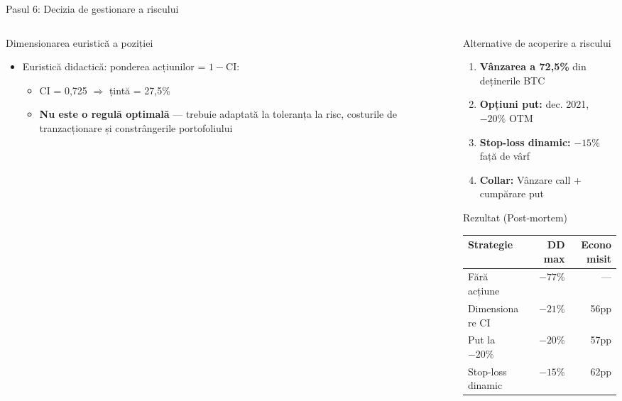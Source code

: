 \documentclass[9pt, aspectratio=169, t]{beamer}
\begin{document}
\begin{frame}{Pasul 6: Decizia de gestionare a riscului}
\begin{cminipage}{0.95\textwidth}
{\begin{columns}[T]
\begin{column}{0.47\textwidth}
            \begin{block}{Dimensionarea euristică a poziției}
                \begin{itemize}\setlength{\itemsep}{0pt}
                    \item Euristică didactică: ponderea acțiunilor = $1 - \text{CI}$:
                    \begin{itemize}\setlength{\itemsep}{0pt}
                        \item CI = 0,725 $\Rightarrow$ țintă = 27,5\%
                        \item \textbf{Nu este o regulă optimală} --- trebuie adaptată la toleranța la risc, costurile de tranzacționare și constrângerile portofoliului
                    \end{itemize}
                \end{itemize}
            \end{block}
        \end{column}
        \begin{column}{0.47\textwidth}
            \begin{exampleblock}{Alternative de acoperire a riscului}
                \begin{enumerate}\setlength{\itemsep}{0pt}
                    \item \textbf{Vânzarea a 72,5\%} din deținerile BTC
                    \item \textbf{Opțiuni put:} dec. 2021, $-20\%$ OTM
                    \item \textbf{Stop-loss dinamic:} $-15\%$ față de vârf
                    \item \textbf{Collar:} Vânzare call + cumpărare put
                \end{enumerate}
            \end{exampleblock}
            \vspace{-1mm}
            \begin{block}{Rezultat (Post-mortem)}
                \begin{tabular}{lrr}
                    \toprule
                    \textbf{Strategie} & \textbf{DD max} & \textbf{Economisit} \\
                    \midrule
                    Fără acțiune & $-77\%$ & --- \\
                    Dimensionare CI & $-21\%$ & 56pp \\
                    Put la $-20\%$ & $-20\%$ & 57pp \\
                    Stop-loss dinamic & $-15\%$ & 62pp \\

\end{tabular}
\end{block}
\end{column}
\end{columns}}
\end{cminipage}
\end{frame}
\end{document}
